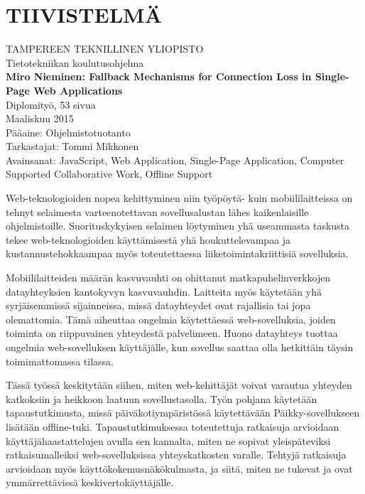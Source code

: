 \newpage
 
\setcounter{page}{1} %
 
\chapter*{TIIVISTELMÄ}
\begin{spacing}{1.0}
\textsf{TAMPEREEN TEKNILLINEN YLIOPISTO}\\
\textsf{Tietotekniikan koulutusohjelma}\\
{\bf \textsf{Miro Nieminen: Fallback Mechanisms for Connection Loss in Single-Page Web Applications}}\\
\textsf{Diplomityö, 53 sivua}\\
\textsf{Maaliskuu 2015}\\
\textsf{Pääaine: Ohjelmistotuotanto}\\
\textsf{Tarkastajat: Tommi Mikkonen}\\
\textsf{Avainsanat: JavaScript, Web Application, Single-Page Application, Computer Supported Collaborative Work, Offline Support}\\
\end{spacing}
 
Web-teknologioiden nopea kehittyminen niin työpöytä- kuin mobiililaitteissa on tehnyt selaimesta varteenotettavan sovellusalustan lähes kaikenlaisille ohjelmistoille. Suorituskykyisen selaimen löytyminen yhä useammasta taskusta tekee web-tek\-no\-lo\-gi\-oi\-den käyttämisestä yhä houkuttelevampaa ja kustannustehokkaampaa myös toteutettaessa liiketoimintakriittisiä sovelluksia.

Mobiililaitteiden määrän kasvuvauhti on ohittanut matkapuhelinverkkojen datayhteyksien kantokyvyn kasvuvauhdin. Laitteita myös käytetään yhä syrjäisemmissä sijainneissa, missä datayhteydet ovat rajallisia tai jopa olemattomia. Tämä aiheuttaa ongelmia käytettäessä web-sovelluksia, joiden toiminta on riippuvainen yhteydestä palvelimeen. Huono datayhteys tuottaa ongelmia web-sovelluksen käyttäjälle, kun sovellus saattaa olla hetkittäin täysin toimimattomassa tilassa.

Tässä työssä keskitytään siihen, miten web-kehittäjät voivat varautua yhteyden katkoksiin ja heikkoon laatuun sovellustasolla. Työn pohjana käytetään tapaustutkimusta, missä päiväkotiympäristössä käytettävään Päikky-sovellukseen lisätään offline-tuki. Tapaustutkimuksessa toteutettuja ratkaisuja arvioidaan käyttäjähaastattelujen avulla sen kannalta, miten ne sopivat yleispäteviksi ratkaisumalleiksi web-sovelluksissa yhteyskatkosten varalle. Tehtyjä ratkaisuja arvioidaan myös käyttökokemusnäkökulmasta, ja siitä, miten ne tukevat ja ovat ymmärrettävissä keskivertokäyttäjälle.


